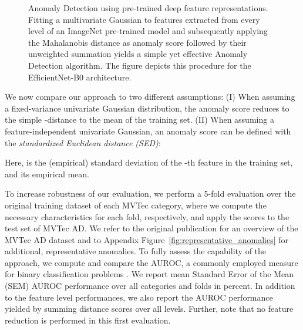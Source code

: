 \documentclass[conference, a4paper]{./template/IEEEtran}
\begin{document}
\begin{figure}
	\caption{Anomaly Detection using pre-trained deep feature representations.
	Fitting a multivariate Gaussian to features extracted from every level of an ImageNet pre-trained model and subsequently applying the Mahalanobis distance as anomaly score followed by their unweighted summation yields a simple yet effective Anomaly Detection algorithm.
	The figure depicts this procedure for the EfficientNet-B0 architecture.}
	\label{fig:features_efficientnet}
\end{figure}

We now compare our approach to two different assumptions:
(I) When assuming a fixed-variance univariate Gaussian distribution, the anomaly score reduces to the simple -distance to the mean of the training set. (II) When assuming a feature-independent univariate Gaussian, an anomaly score can be defined with the \emph{standardized Euclidean distance (SED)}: 

Here,  is the (empirical) standard deviation of the -th feature in the training set, and  its empirical mean.

To increase robustness of our evaluation, we perform a 5-fold evaluation over the original training dataset of each MVTec category, where we compute the necessary characteristics for each fold, respectively, and apply the scores to the test set of MVTec AD.
We refer to the original publication \cite{Bergmann2019} for an overview of the MVTec AD dataset and to Appendix Figure~\ref{fig:representative_anomalies} for additional, representative anomalies.
To fully assess the capability of the approach, we compute and compare the AUROC, a commonly employed measure for binary classification problems \cite{Ferri2011}.
We report mean  Standard Error of the Mean (SEM) AUROC performance over all categories and folds in percent.
In addition to the feature level performances, we also report the AUROC performance yielded by summing distance scores over all levels.
Further, note that no feature reduction is performed in this first evaluation.
\end{document}
